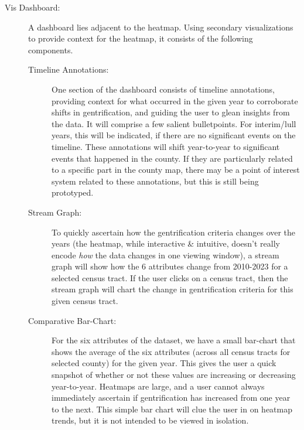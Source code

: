 \documentclass{article}
\begin{document}
\begin{description}
\begin{description}
        \item[Vis Dashboard:] A dashboard lies adjacent to the heatmap. Using secondary visualizations to provide context for the heatmap, it consists of the following components.
        
        \begin{description}
        
            \item[Timeline Annotations:] One section of the dashboard consists of timeline annotations, providing context for what occurred in the given year to corroborate shifts in gentrification, and guiding the user to glean insights from the data. It will comprise a few salient bulletpoints. For interim/lull years, this will be indicated, if there are no significant events on the timeline. These annotations will shift year-to-year to significant events that happened in the county. If they are particularly related to a specific part in the county map, there may be a point of interest system related to these annotations, but this is still being prototyped.
            
            \item[Stream Graph:] To quickly ascertain how the gentrification criteria changes over the years (the heatmap, while interactive \& intuitive, doesn't really encode \textit{how} the data changes in one viewing window), a stream graph will show how the 6 attributes change from 2010-2023 for a selected census tract. If the user clicks on a census tract, then the stream graph will chart the change in gentrification criteria for this given census tract.
            
            \item[Comparative Bar-Chart:] For the six attributes of the dataset, we have a small bar-chart that shows the average of the six attributes (across all census tracts for selected county) for the given year. This gives the user a quick snapshot of whether or not these values are increasing or decreasing year-to-year. Heatmaps are large, and a user cannot always immediately ascertain if gentrification has increased from one year to the next. This simple bar chart will clue the user in on heatmap trends, but it is not intended to be viewed in isolation. 
            
        \end{description}
        
    \end{description}
    
\end{description}
\end{document}
